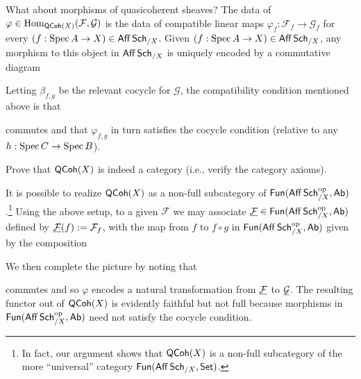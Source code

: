 \documentclass[11pt]{article}
\renewcommand{\F}{\mathcal{F}}
\newcommand{\G}{\mathcal{G}}
\renewcommand{\phi}{\varphi}
\begin{document}
What about morphisms of quasicoherent sheaves? The data of $\phi\in\Hom_{\QCoh(X)}(\F,\G)$ is the data of compatible linear maps $\phi_f: \F_f\to\G_f$ for every $(f: \operatorname{Spec} A\to X)\in\operatorname{\mathsf{Aff}}\operatorname{\mathsf{Sch}}_{/X}$. Given $(f: \operatorname{Spec} A\to X)\in\operatorname{\mathsf{Aff}}\operatorname{\mathsf{Sch}}_{/X}$, any morphism to this object in $\operatorname{\mathsf{Aff}}\operatorname{\mathsf{Sch}}_{/X}$ is uniquely encoded by a commutative diagram
\begin{center}
\end{center}
Letting $\beta_{f,g}$ be the relevant cocycle for $\G$, the compatibility condition mentioned above is that
\begin{center}
\end{center}
commutes and that $\phi_{f,g}$ in turn satisfies the cocycle condition (relative to any $h: \operatorname{Spec} C\to\operatorname{Spec} B$).

\begin{exercise}
Prove that $\operatorname{\mathsf{QCoh}}(X)$ is indeed a category (i.e., verify the category axioms).
\end{exercise}

It is possible to realize $\operatorname{\mathsf{QCoh}}(X)$ as a non-full subcategory of $\operatorname{\mathsf{Fun}}(\operatorname{\mathsf{Aff}}\operatorname{\mathsf{Sch}}_{/X}^{\operatorname{op}},\operatorname{\mathsf{Ab}})$.\footnote{In fact, our argument shows that $\operatorname{\mathsf{QCoh}}(X)$ is a non-full subcategory of the more ``universal'' category $\operatorname{\mathsf{Fun}}(\operatorname{\mathsf{Aff}}\operatorname{\mathsf{Sch}}_{/X},\operatorname{\mathsf{Set}})$.} Using the above setup, to a given $\F$ we may associate $\un{\F}\in\Fun(\Aff\Sch_{/X}^{\op},\Ab)$ defined by $\un{\F}(f):=\F_f$, with the map from $f$ to $f\circ g$ in $\operatorname{\mathsf{Fun}}(\operatorname{\mathsf{Aff}}\operatorname{\mathsf{Sch}}_{/X}^{\operatorname{op}},\operatorname{\mathsf{Ab}})$ given by the composition 
\begin{center}
\end{center}
We then complete the picture by noting that
\begin{center}
\end{center}
commutes and so $\phi$ encodes a natural transformation from $\un{\F}$ to $\un{\G}$. The resulting functor out of $\operatorname{\mathsf{QCoh}}(X)$ is evidently faithful but not full because morphisms in $\operatorname{\mathsf{Fun}}(\operatorname{\mathsf{Aff}}\operatorname{\mathsf{Sch}}_{/X}^{\operatorname{op}},\operatorname{\mathsf{Ab}})$ need not satisfy the cocycle condition.
\end{document}
